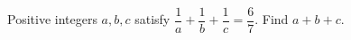 Positive integers $a,b,c$ satisfy $\dfrac{1}{a}+\dfrac{1}{b}+\dfrac{1}{c}=\dfrac{6}{7}$. Find $a+b+c$.
